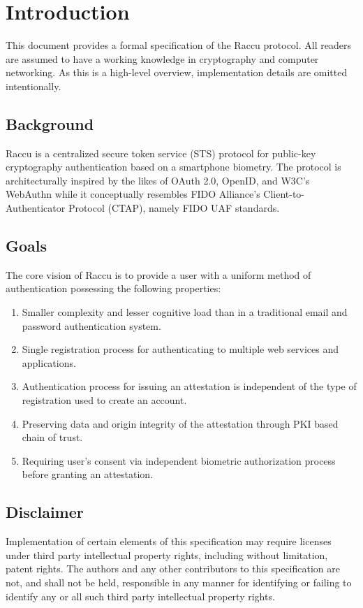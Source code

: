 \section{Introduction}
This document provides a formal specification of the Raccu protocol. All readers are assumed to have a working 
knowledge in cryptography and computer networking. As this is a high-level overview, implementation details are 
omitted intentionally.

    \subsection{Background}
    Raccu is a centralized secure token service (STS) protocol for public-key cryptography authentication 
    based on a smartphone biometry. The protocol is architecturally inspired by the likes of OAuth 2.0, OpenID, 
    and W3C's WebAuthn while it conceptually resembles FIDO Alliance's Client-to-Authenticator Protocol (CTAP), 
    namely FIDO UAF standards.

    \subsection{Goals}
    The core vision of Raccu is to provide a user with a uniform method of authentication possessing the 
    following properties: 
        \begin{enumerate}
            \item Smaller complexity and lesser cognitive load than in a traditional email and password 
                  authentication system.
            \item Single registration process for authenticating to multiple web services and applications.
            \item Authentication process for issuing an attestation is independent of the type of registration 
                  used to create an account.
            \item Preserving data and origin integrity of the attestation through PKI based chain of trust.
            \item Requiring user's consent via independent biometric authorization process before granting an 
                  attestation.
        \end{enumerate}

    \subsection{Disclaimer}
    Implementation of certain elements of this specification may require licenses under third party intellectual 
    property rights, including without limitation, patent rights. The authors and any other contributors to this 
    specification are not, and shall not be held, responsible in any manner for identifying or failing to identify 
    any or all such third party intellectual property rights.    
    
